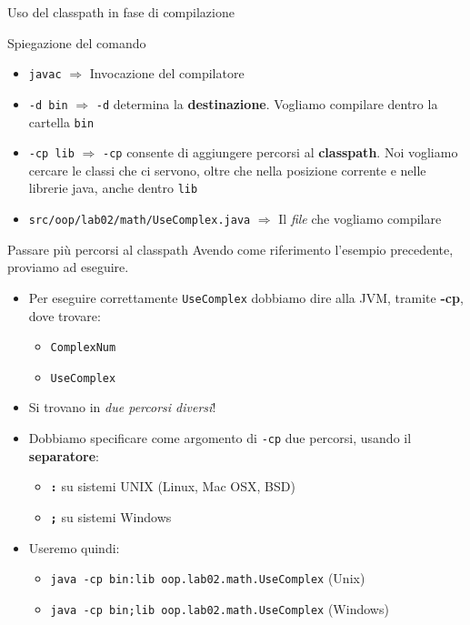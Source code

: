 \documentclass[xcolor=dvipsnames,presentation]{beamer}
\begin{document}
\begin{frame}{Uso del classpath in fase di compilazione}
\begin{block}{Spiegazione del comando}
        \begin{itemize}
            \item \texttt{javac} $\Rightarrow$ Invocazione del compilatore
            \item \texttt{-d bin} $\Rightarrow$ \texttt{-d} determina la \textbf{destinazione}.
Vogliamo compilare dentro la cartella \texttt{bin}
            \item \texttt{-cp lib} $\Rightarrow$ \texttt{-cp} consente di aggiungere percorsi al
            \textbf{classpath}. Noi vogliamo cercare le classi che ci servono, oltre che nella
            posizione corrente e nelle librerie java, anche dentro \texttt{lib}
            \item \texttt{src/oop/lab02/math/UseComplex.java} $\Rightarrow$ Il \textit{file} che
vogliamo compilare
        \end{itemize}
    \end{block}
\end{frame}

\begin{frame}{Passare più percorsi al classpath}
    Avendo come riferimento l'esempio precedente, proviamo ad eseguire.
    \begin{itemize}
    \item Per eseguire correttamente \texttt{UseComplex} dobbiamo dire alla JVM, tramite
\textbf{-cp}, dove trovare:
    \begin{itemize}
        \item \texttt{ComplexNum}
        \item \texttt{UseComplex}
    \end{itemize}
        \item Si trovano in \textit{due percorsi diversi}!
        \item Dobbiamo specificare come argomento di \texttt{-cp} due percorsi, usando il
\textbf{separatore}:
        \begin{itemize}
            \item \textbf{\texttt{:}} su sistemi UNIX (Linux, Mac OSX, BSD)
            \item \textbf{\texttt{;}} su sistemi Windows
        \end{itemize}
        \item Useremo quindi:
        \begin{itemize}
            \item \texttt{java -cp bin:lib oop.lab02.math.UseComplex} (Unix)
            \item \texttt{java -cp bin;lib oop.lab02.math.UseComplex} (Windows)
        \end{itemize}
    \end{itemize}
\end{frame}
\end{document}
